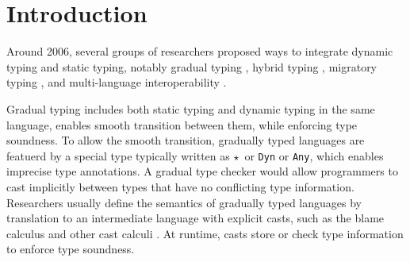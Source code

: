 \documentclass[runningheads]{llncs}
\newcommand{\Tdyn}[0]{\ensuremath{\star}}
\begin{document}
\section{Introduction}
Around 2006, several groups of researchers proposed ways to integrate
dynamic typing and static typing, notably gradual typing
\citep{siek2006gradual}, hybrid typing \citep{knowles2010hybrid},
migratory typing \citep{tobin2006interlanguage}, and multi-language
interoperability \citep{Gray:2005ij,Matthews:2007zr}.


Gradual typing \citep{siek2006gradual,siek2015refined} includes both static typing 
and dynamic typing in the same language, enables smooth transition between them, while
enforcing type soundness.
To allow the smooth transition, gradually typed languages are featuerd by a special type
typically written as \Tdyn\ or \lstinline|Dyn| or \lstinline|Any|, which enables 
imprecise type annotations. A gradual type checker would allow programmers to cast 
implicitly between types that have no conflicting type information.
Researchers usually define the semantics of gradually typed languages by
translation to an intermediate language with explicit casts, such as the blame
calculus \citep{wadler2009well} and other cast calculi \citep{siek2009exploring}.
At runtime, casts store or check type information to enforce type soundness.
\end{document}
